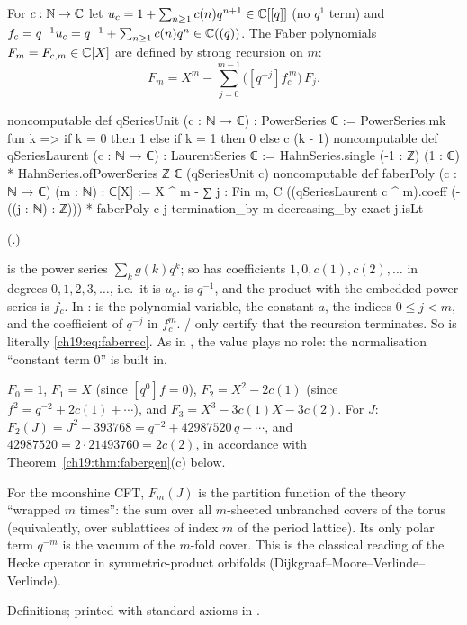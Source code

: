 \begin{definition}\label{ch19:def:faber}
For $c:{\mathbb{N}}\to{\mathbb{C}}$ let $u_c=1+\sum_{n\ge1}c(n)q^{n+1}\in{\mathbb{C}}[[q]]$ (no $q^1$ term) and $f_c=q^{-1}u_c=q^{-1}+\sum_{n\ge1}c(n)q^n\in
{\mathbb{C}}((q))$.  The Faber polynomials $F_m=F_{c,m}\in{\mathbb{C}}[X]$ are defined by strong recursion on $m$:
\begin{equation}\label{ch19:eq:faberrec}
  F_m=X^m-\sum_{j=0}^{m-1}\bigl([q^{-j}]f_c^{\,m}\bigr)\,F_j .
\end{equation}
\end{definition}
\begin{leancode}
noncomputable def qSeriesUnit (c : ℕ → ℂ) : PowerSeries ℂ :=
  PowerSeries.mk fun k => if k = 0 then 1 else if k = 1 then 0 else c (k - 1)
noncomputable def qSeriesLaurent (c : ℕ → ℂ) : LaurentSeries ℂ :=
  HahnSeries.single (-1 : ℤ) (1 : ℂ) * HahnSeries.ofPowerSeries ℤ ℂ (qSeriesUnit c)
noncomputable def faberPoly (c : ℕ → ℂ) (m : ℕ) : ℂ[X] :=
  X ^ m - ∑ j : Fin m, C ((qSeriesLaurent c ^ m).coeff (-((j : ℕ) : ℤ))) * faberPoly c j
termination_by m
decreasing_by exact j.isLt
\end{leancode}
(.)
\begin{dictionary}
 is the power series $\sum_kg(k)q^k$; so  has coefficients $1,0,c(1),c(2),\dots$
in degrees $0,1,2,3,\dots$, i.e.\ it is $u_c$.   is $q^{-1}$, and the product with the
embedded power series is $f_c$.  In :  is the polynomial variable,  the constant $a$,
 the indices $0\le j<m$, and  the coefficient of $q^{-j}$ in $f_c^m$.
/ only certify that the recursion terminates.  So  is
literally \eqref{ch19:eq:faberrec}.  As in , the value  plays no role: the normalisation
``constant term $0$'' is built in.
\end{dictionary}
\begin{example}\label{ch19:ex:faber}
$F_0=1$, $F_1=X$ (since $[q^0]f=0$), $F_2=X^2-2c(1)$ (since $f^2=q^{-2}+2c(1)+\cdots$), and
$F_3=X^3-3c(1)X-3c(2)$.  For $J$: $F_2(J)=J^2-393768=q^{-2}+42987520\,q+\cdots$, and $42987520=2\cdot21493760=2c(2)$, in
accordance with Theorem~\ref{ch19:thm:fabergen}(c) below.
\end{example}
\begin{physics}
For the moonshine CFT, $F_m(J)$ is the partition function of the theory ``wrapped $m$ times'': the sum over all
$m$-sheeted unbranched covers of the torus (equivalently, over sublattices of index $m$ of the period lattice).  Its only
polar term $q^{-m}$ is the vacuum of the $m$-fold cover.  This is the classical reading of the Hecke operator in
symmetric-product orbifolds (Dijkgraaf--Moore--Verlinde--Verlinde).
\end{physics}
\begin{status}
Definitions; printed with standard axioms in .
\end{status}

